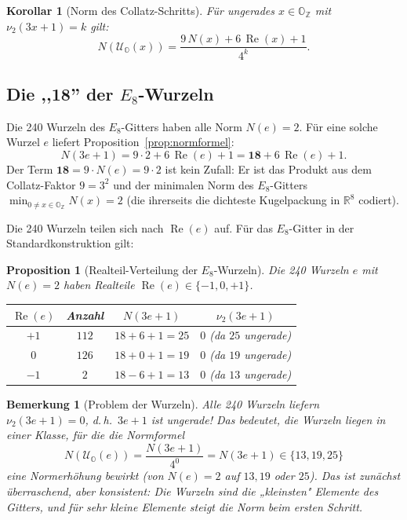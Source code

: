 \documentclass[12pt,a4paper]{article}
\newtheorem{proposition}[definition]{Proposition}
\newtheorem{korollar}[definition]{Korollar}
\newtheorem{bemerkung}[definition]{Bemerkung}
\newcommand{\vii}{\nu_2}           %
\newcommand{\OZ}{\mathbb{O}_{\mathbb{Z}}}  %
\newcommand{\Norm}[1]{N(#1)}       %
\renewcommand{\Re}{\operatorname{Re}}
\newcommand{\R}{\mathbb{R}}
\newcommand{\Uo}{\mathcal{U}_{\mathbb{O}}} %
\begin{document}
\begin{korollar}[Norm des Collatz-Schritts]
Für ungerades $x \in \OZ$ mit $\vii(3x+1) = k$ gilt:
\[
  \Norm{\Uo(x)} = \frac{9\,\Norm{x} + 6\,\Re(x) + 1}{4^k}.
\]
\end{korollar}

\subsection{Die \texorpdfstring{,,18''}{18} der \texorpdfstring{$E_8$}{E8}-Wurzeln}

\begin{tcolorbox}[kernidee, title={Die strukturelle „18"}]
Die 240 Wurzeln des $E_8$-Gitters haben alle Norm $\Norm{e} = 2$.
Für eine solche Wurzel $e$ liefert Proposition~\ref{prop:normformel}:
\[
  \Norm{3e+1} = 9 \cdot 2 + 6\,\Re(e) + 1 = \mathbf{18} + 6\,\Re(e) + 1.
\]
Der Term $\mathbf{18} = 9 \cdot \Norm{e} = 9 \cdot 2$ ist kein Zufall:
Er ist das Produkt aus dem Collatz-Faktor $9 = 3^2$ und der minimalen
Norm des $E_8$-Gitters $\min_{0 \neq x \in \OZ} \Norm{x} = 2$
(die ihrerseits die dichteste Kugelpackung in $\R^8$ codiert).
\end{tcolorbox}

Die 240 Wurzeln teilen sich nach $\Re(e)$ auf. Für das $E_8$-Gitter
in der Standardkonstruktion gilt:

\begin{proposition}[Realteil-Verteilung der $E_8$-Wurzeln]\label{prop:realteil-verteilung}
Die 240 Wurzeln $e$ mit $\Norm{e}=2$ haben Realteile
$\Re(e) \in \{-1, 0, +1\}$.
\begin{center}
\renewcommand{\arraystretch}{1.3}
\begin{tabular}{cccc}
\toprule
$\Re(e)$ & Anzahl & $\Norm{3e+1}$ & $\vii(3e+1)$\\
\midrule
$+1$     & $112$  & $18 + 6 + 1 = 25$ & $0$ (da $25$ ungerade)\\
$0$      & $126$  & $18 + 0 + 1 = 19$ & $0$ (da $19$ ungerade)\\
$-1$     & $2$    & $18 - 6 + 1 = 13$ & $0$ (da $13$ ungerade)\\
\bottomrule
\end{tabular}
\end{center}
\end{proposition}

\begin{bemerkung}[Problem der Wurzeln]\label{bem:problem-wurzeln}
Alle 240 Wurzeln liefern $\vii(3e+1) = 0$, d.\,h.\ $3e+1$ ist ungerade!
Das bedeutet, die Wurzeln liegen in einer Klasse, für die die Normformel
\[
  \Norm{\Uo(e)} = \frac{\Norm{3e+1}}{4^0} = \Norm{3e+1} \in \{13, 19, 25\}
\]
eine \emph{Normerhöhung} bewirkt (von $\Norm{e}=2$ auf $13, 19$ oder $25$).
Das ist zunächst überraschend, aber konsistent: Die Wurzeln sind die
„kleinsten" Elemente des Gitters, und für sehr kleine Elemente steigt
die Norm beim ersten Schritt.
\end{bemerkung}
\end{document}
